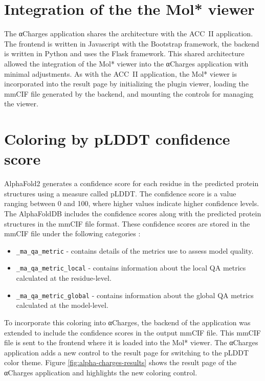 \documentclass[
  digital,     %
  oneside,     %
  nosansbold,  %
  nocolorbold, %
  lof,         %
  lot,         %
]{fithesis4}
\begin{document}
\section{Integration of the the Mol* viewer}

The αCharges application shares the architecture with the ACC~II application. The frontend is written in Javascript with the Bootstrap framework, the backend is written in Python and uses the Flask framework. This shared architecture allowed the integration of the Mol* viewer into the αCharges application with minimal adjustments. As with the ACC~II application, the Mol* viewer is incorporated into the result page by initializing the plugin viewer, loading the mmCIF file generated by the backend, and mounting the controls for managing the viewer.


\section{Coloring by pLDDT confidence score}

AlphaFold2 generates a confidence score for each residue in the predicted protein structures using a measure called pLDDT. The confidence score is a value ranging between 0 and 100, where higher values indicate higher confidence levels. \cite{varadi2021alphafold} The AlphaFoldDB includes the confidence scores along with the predicted protein structures in the mmCIF file format. These confidence scores are stored in the mmCIF file under the following categories \cite{mmcif_dictionary}:

\begin{itemize}
  \item \texttt{\_ma\_qa\_metric} - contains details of the metrics use to assess model quality.
  \item \texttt{\_ma\_qa\_metric\_local} - contains information about the local QA metrics calculated at the residue-level.
  \item \texttt{\_ma\_qa\_metric\_global} - contains information about the global QA metrics calculated at the model-level.
\end{itemize}

To incorporate this coloring into αCharges, the backend of the application was extended to include the confidence scores in the output mmCIF file. This mmCIF file is sent to the frontend where it is loaded into the Mol* viewer. The αCharges application adds a new control to the result page for switching to the pLDDT color theme. Figure \ref{fig:alpha-charges-results} shows the result page of the αCharges application and highlights the new coloring control.
\end{document}
